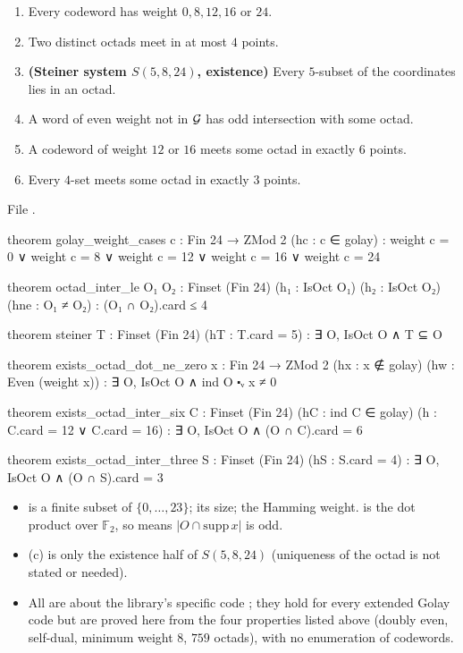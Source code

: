 \begin{theorem}\label{ch12:thm:golayfacts}
\begin{enumerate}[label=(\alph*)]
\item Every codeword has weight $0,8,12,16$ or $24$.
\item Two distinct octads meet in at most $4$ points.
\item \textbf{(Steiner system $S(5,8,24)$, existence)} Every $5$-subset of the coordinates lies in an
  octad.
\item A word of even weight not in $\mathcal{G}$ has odd intersection with some octad.
\item A codeword of weight $12$ or $16$ meets some octad in exactly $6$ points.
\item Every $4$-set meets some octad in exactly $3$ points.
\end{enumerate}
\end{theorem}
File .
\begin{leancode}
theorem golay_weight_cases {c : Fin 24 → ZMod 2} (hc : c ∈ golay) :
    weight c = 0 ∨ weight c = 8 ∨ weight c = 12 ∨ weight c = 16 ∨ weight c = 24

theorem octad_inter_le {O₁ O₂ : Finset (Fin 24)} (h₁ : IsOct O₁) (h₂ : IsOct O₂) (hne : O₁ ≠ O₂) :
    (O₁ ∩ O₂).card ≤ 4

theorem steiner {T : Finset (Fin 24)} (hT : T.card = 5) : ∃ O, IsOct O ∧ T ⊆ O

theorem exists_octad_dot_ne_zero {x : Fin 24 → ZMod 2} (hx : x ∉ golay) (hw : Even (weight x)) :
    ∃ O, IsOct O ∧ ind O ⬝ᵥ x ≠ 0

theorem exists_octad_inter_six {C : Finset (Fin 24)} (hC : ind C ∈ golay)
    (h : C.card = 12 ∨ C.card = 16) : ∃ O, IsOct O ∧ (O ∩ C).card = 6

theorem exists_octad_inter_three {S : Finset (Fin 24)} (hS : S.card = 4) :
    ∃ O, IsOct O ∧ (O ∩ S).card = 3
\end{leancode}
\begin{dictionary}
\begin{itemize}
\item {} is a finite subset of $\{0,\dots,23\}$;  its size;
   the Hamming weight.   is the dot product over $\mathbb F_2$, so
   means $|O\cap\mathrm{supp}\,x|$ is odd.
\item (c) is only the existence half of $S(5,8,24)$ (uniqueness of the octad is not stated or needed).
\item All are about the library's specific code ; they hold for every extended Golay code but
  are proved here from the four properties listed above (doubly even, self-dual, minimum weight $8$,
  $759$ octads), with no enumeration of codewords.
\end{itemize}
\end{dictionary}

